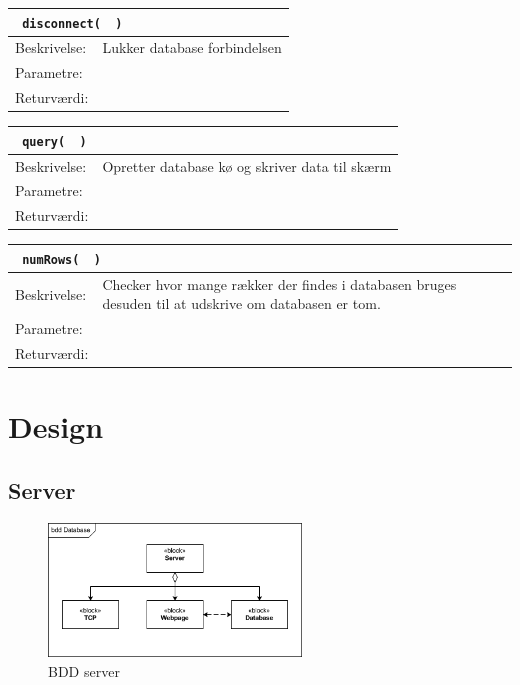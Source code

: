 \begin{table}[H]
\begin{tabular}{l p{12.5cm}}
\multicolumn{2}{l}{\texttt{\textcolor{blue}{} disconnect( \textcolor{blue}{} )}} \\
\hline
Beskrivelse:&Lukker database forbindelsen\\
Parametre:&\\
Returværdi:&\\
\end{tabular}
\end{table}

\begin{table}[H]
\begin{tabular}{l p{12.5cm}}
\multicolumn{2}{l}{\texttt{\textcolor{blue}{} query( \textcolor{blue}{} )}} \\
\hline
Beskrivelse:&Opretter database kø og skriver data til skærm\\
Parametre:&\\
Returværdi:&\\
\end{tabular}
\end{table}

\begin{table}[H]
\begin{tabular}{l p{12.5cm}}
\multicolumn{2}{l}{\texttt{\textcolor{blue}{} numRows( \textcolor{blue}{} )}} \\
\hline
Beskrivelse:&Checker hvor mange rækker der findes i databasen bruges desuden til at udskrive om databasen er tom.\\
Parametre:&\\
Returværdi:&\\
\end{tabular}
\end{table}

\section{Design}
\subsection{Server}
\begin{figure}[htbp]
	\centering
	\includegraphics[width=0.6\textwidth]{billeder/bdd_server}
	\caption{BDD server}
	\label{fig:bdd_server}
\end{figure}

